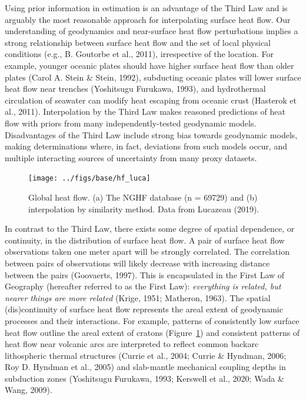 \documentclass[draft,linenumbers]{agujournal2018}
\begin{document}
Using prior information in estimation is an advantage of the Third Law
and is arguably the most reasonable approach for interpolating surface
heat flow. Our understanding of geodynamics and near-surface heat flow
perturbations implies a strong relationship between surface heat flow
and the set of local physical conditions (e.g., B. Goutorbe et al.,
2011), irrespective of the location. For example, younger oceanic plates
should have higher surface heat flow than older plates (Carol A. Stein
\& Stein, 1992), subducting oceanic plates will lower surface heat flow
near trenches (Yoshitsugu Furukawa, 1993), and hydrothermal circulation
of seawater can modify heat escaping from oceanic crust (Hasterok et
al., 2011). Interpolation by the Third Law makes reasoned predictions of
heat flow with priors from many independently-tested geodynamic models.
Disadvantages of the Third Law include strong bias towards geodynamic
models, making determinations where, in fact, deviations from such
models occur, and multiple interacting sources of uncertainty from many
proxy datasets.

\begin{figure}[h]

{\centering \texttt{[image: ../figs/base/hf\_luca]} 

}

\caption{Global heat flow. (a) The NGHF database (n = 69729) and (b) interpolation by similarity method. Data from Lucazeau (2019).}\label{fig:lucahf}
\end{figure}

In contrast to the Third Law, there exists some degree of spatial
dependence, or continuity, in the distribution of surface heat flow. A
pair of surface heat flow observations taken one meter apart will be
strongly correlated. The correlation between pairs of observations will
likely decrease with increasing distance between the pairs (Goovaerts,
1997). This is encapsulated in the First Law of Geography (hereafter
referred to as the First Law): \emph{everything is related, but nearer
things are more related} (Krige, 1951; Matheron, 1963). The spatial
(dis)continuity of surface heat flow represents the areal extent of
geodynamic processes and their interactions. For example, patterns of
consistently low surface heat flow outline the areal extent of cratons
(Figure~\ref{fig:lucahf}) and consistent patterns of heat flow near
volcanic arcs are interpreted to reflect common backarc lithospheric
thermal structures (Currie et al., 2004; Currie \& Hyndman, 2006; Roy D.
Hyndman et al., 2005) and slab-mantle mechanical coupling depths in
subduction zones (Yoshitsugu Furukawa, 1993; Kerswell et al., 2020; Wada
\& Wang, 2009).
\end{document}
